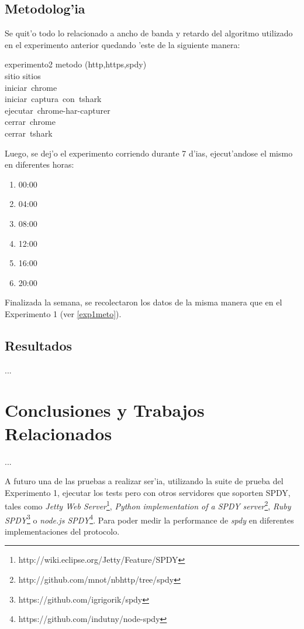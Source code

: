 \documentclass[a4paper,11pt,twocolumn]{article}
\begin{document}
\subsection{Metodolog'ia}

Se quit'o todo lo relacionado a ancho de banda y retardo del algoritmo utilizado en el experimento anterior quedando 'este de la siguiente manera:

\begin{pseudocode}{experimento2}{ }
\FOR metodo \in (http,https,spdy) \DO \\
\BEGIN
	\FOR sitio \in sitios \DO \\
	\BEGIN
		iniciar\ chrome\\
		iniciar\ captura\ con\ tshark\\
		ejecutar\ chrome-har-capturer\\
		cerrar\ chrome\\
		cerrar\ tshark
	\END
\END
\end{pseudocode}

Luego, se dej'o el experimento corriendo durante 7 d'ias, ejecut'andose el mismo en diferentes horas:

\begin{enumerate}
\item 00:00
\item 04:00
\item 08:00
\item 12:00
\item 16:00
\item 20:00
\end{enumerate}

Finalizada la semana, se recolectaron los datos de la misma manera que en el Experimento 1 (ver \ref{exp1meto}).

\subsection{Resultados}

...

\section{Conclusiones y Trabajos Relacionados}

...


A futuro una de las pruebas a realizar ser'ia, utilizando la suite de prueba del Experimento 1, ejecutar los tests pero con otros servidores que soporten SPDY, tales como \emph{Jetty Web Server}\footnote{http://wiki.eclipse.org/Jetty/Feature/SPDY}, \emph{Python implementation of a SPDY server}\footnote{http://github.com/mnot/nbhttp/tree/spdy}, \emph{Ruby SPDY}\footnote{https://github.com/igrigorik/spdy} o \emph{node.js SPDY}\footnote{https://github.com/indutny/node-spdy}. Para poder medir la performance de \emph{spdy} en diferentes implementaciones del protocolo.
\end{document}
